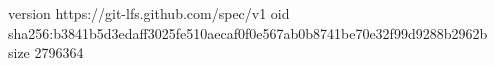 version https://git-lfs.github.com/spec/v1
oid sha256:b3841b5d3edaff3025fe510aecaf0f0e567ab0b8741be70e32f99d9288b2962b
size 2796364

